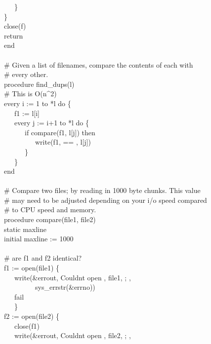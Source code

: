 {\>   \ \ \ \} \\
\>   \} \\
\>   close(f) \\
\>   return {\textquotedbl}{\textquotedbl} \\
end \\
\ \\
\# Given a list of filenames, compare the contents of each with \\
\# every other. \\
procedure find\_dups(l) \\
\>   \# This is O(n\^{}2) \\
\>   every i := 1 to *l do \{ \\
\>   \ \ \ f1 := l[i] \\
\>   \ \ \ every j := i+1 to *l do \{ \\
\>   \ \ \ \ \ \ if compare(f1, l[j]) then \\
\>   \ \ \ \ \ \ \ \ \ write(f1, {\textquotedbl} == {\textquotedbl},
l[j]) \\
\>   \ \ \ \ \ \ \} \\
\>   \ \ \ \} \\
end \\
\ \\
\# Compare two files; by reading in 1000 byte chunks. This value \\
\# may need to be adjusted depending on your i/o speed compared \\
\# to CPU speed and memory. \\
procedure compare(file1, file2) \\
\>   static maxline \\
\>   initial maxline := 1000 \\
\ \\
\>   \# are f1 and f2 identical? \\
\>   f1 := open(file1) {\textbar} \{ \\
\>   \ \ \ write(\&errout, {\textquotedbl}Couldn{\textquotesingle}t
open {\textquotedbl}, file1, {\textquotedbl}; {\textquotedbl}, \\
\>   \ \ \ \ \ \ \ \ \ sys\_errstr(\&errno)) \\
\>   \ \ \ fail \\
\>   \ \ \ \} \\
\>   f2 := open(file2) {\textbar} \{ \\
\>   \ \ \ close(f1) \\
\>   \ \ \ write(\&errout, {\textquotedbl}Couldn{\textquotesingle}t
open {\textquotedbl}, file2, {\textquotedbl}; {\textquotedbl}, \\
}
